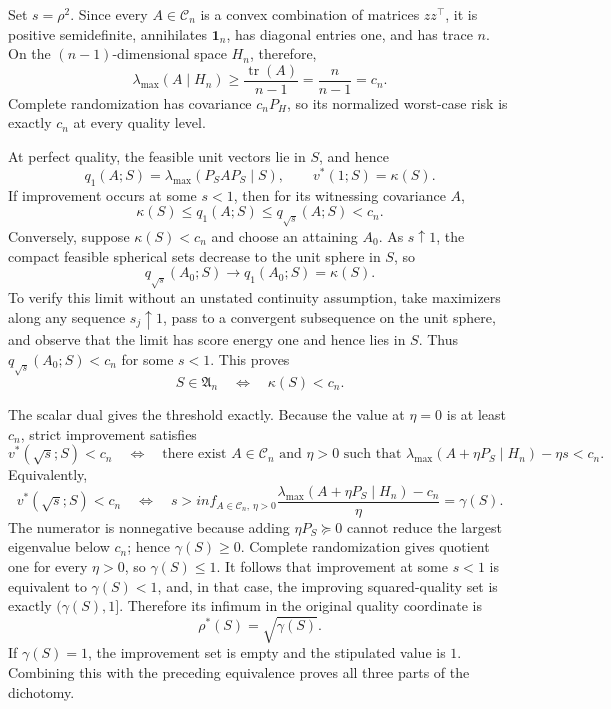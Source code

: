 Set \(s=\rho^2\).  Since every \(A\in\mathcal C_n\) is a convex combination of matrices \(zz^\top\), it is positive semidefinite, annihilates \(\mathbf 1_n\), has diagonal entries one, and has trace \(n\).  On the \((n-1)\)-dimensional space \(H_n\), therefore,
\[
\lambda_{\max}(A\mid H_n)\geq\frac{\operatorname{tr}(A)}{n-1}
=\frac{n}{n-1}=c_n.
\]
Complete randomization has covariance \(c_nP_H\), so its normalized worst-case risk is exactly \(c_n\) at every quality level.

At perfect quality, the feasible unit vectors lie in \(S\), and hence
\[
q_1(A;S)=\lambda_{\max}(P_SAP_S\mid S),
\qquad v^*(1;S)=\kappa(S).
\]
If improvement occurs at some \(s<1\), then for its witnessing covariance \(A\),
\[
\kappa(S)\leq q_1(A;S)\leq q_{\sqrt{s}}(A;S)<c_n.
\]
Conversely, suppose \(\kappa(S)<c_n\) and choose an attaining \(A_0\).  As \(s\uparrow1\), the compact feasible spherical sets decrease to the unit sphere in \(S\), so
\[
q_{\sqrt{s}}(A_0;S)\longrightarrow q_1(A_0;S)=\kappa(S).
\]
To verify this limit without an unstated continuity assumption, take maximizers along any sequence \(s_j\uparrow1\), pass to a convergent subsequence on the unit sphere, and observe that the limit has score energy one and hence lies in \(S\).  Thus \(q_{\sqrt{s}}(A_0;S)<c_n\) for some \(s<1\).  This proves
\[
S\in\mathfrak A_n\quad\Longleftrightarrow\quad\kappa(S)<c_n.
\]

The scalar dual gives the threshold exactly.  Because the value at \(\eta=0\) is at least \(c_n\), strict improvement satisfies
\[
v^*(\sqrt{s};S)<c_n
\quad\Longleftrightarrow\quad
\text{there exist }A\in\mathcal C_n\text{ and }\eta>0\text{ such that }
\lambda_{\max}(A+\eta P_S\mid H_n)-\eta s<c_n.
\]
Equivalently,
\[
v^*(\sqrt{s};S)<c_n
\quad\Longleftrightarrow\quad
s>inf_{A\in\mathcal C_n,\,\eta>0}
\frac{\lambda_{\max}(A+\eta P_S\mid H_n)-c_n}{\eta}
=\gamma(S).
\]
The numerator is nonnegative because adding \(\eta P_S\succeq0\) cannot reduce the largest eigenvalue below \(c_n\); hence \(\gamma(S)\geq0\).  Complete randomization gives quotient one for every \(\eta>0\), so \(\gamma(S)\leq1\).  It follows that improvement at some \(s<1\) is equivalent to \(\gamma(S)<1\), and, in that case, the improving squared-quality set is exactly \((\gamma(S),1]\).  Therefore its infimum in the original quality coordinate is
\[
\rho^*(S)=\sqrt{\gamma(S)}.
\]
If \(\gamma(S)=1\), the improvement set is empty and the stipulated value is \(1\).  Combining this with the preceding equivalence proves all three parts of the dichotomy.

